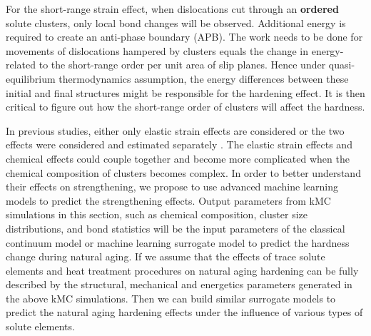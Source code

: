For the short-range strain effect, when dislocations cut through an \textbf{ordered} solute clusters, only local bond changes will be observed. Additional energy is required to create an anti-phase boundary (APB). The work needs to be done for movements of dislocations hampered by clusters equals the change in energy-related to the short-range order per unit area of slip planes. Hence under quasi-equilibrium thermodynamics assumption, the energy differences between these initial and final structures might be responsible for the hardening effect. It is then critical to figure out how the short-range order of clusters will affect the hardness.

In previous studies, either only elastic strain effects are considered \cite{zhao2014cluster} or the two effects were considered and estimated separately \cite{yasi2010first}. The elastic strain effects and chemical effects could couple together and become more complicated when the chemical composition of clusters becomes complex. In order to better understand their effects on strengthening, we propose to use advanced machine learning models to predict the strengthening effects. Output parameters from \ac{kMC} simulations in this section, such as chemical composition, cluster size distributions, and bond statistics will be the input parameters of the classical continuum model or machine learning surrogate model to predict the hardness change during natural aging. If we assume that the effects of trace solute elements and heat treatment procedures on natural aging hardening can be fully described by the structural, mechanical and energetics parameters generated in the above \ac{kMC} simulations. Then we can build similar surrogate models to predict the natural aging hardening effects under the influence of various types of solute elements.